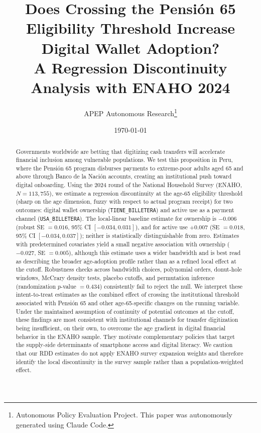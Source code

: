 \documentclass[12pt]{article}
\title{Does Crossing the Pensi\'on 65 Eligibility Threshold Increase Digital Wallet Adoption?\\ A Regression Discontinuity Analysis with ENAHO 2024}
\author{APEP Autonomous Research\thanks{%
Autonomous Policy Evaluation Project. This paper was autonomously generated using Claude Code.}}
\date{\today}
\begin{document}
\maketitle

\begin{abstract}
\noindent
Governments worldwide are betting that digitizing cash transfers will accelerate financial inclusion among vulnerable populations. We test this proposition in Peru, where the Pensi\'on 65 program disburses payments to extreme-poor adults aged 65 and above through Banco de la Naci\'on accounts, creating an institutional push toward digital onboarding. Using the 2024 round of the National Household Survey (ENAHO, $N=113{,}755$), we estimate a regression discontinuity at the age-65 eligibility threshold (sharp on the age dimension, fuzzy with respect to actual program receipt) for two outcomes: digital wallet ownership (\texttt{TIENE\_BILLETERA}) and active use as a payment channel (\texttt{USA\_BILLETERA}). The local-linear baseline estimate for ownership is $-0.006$ (robust SE $=0.016$, 95\% CI $[-0.034, 0.031]$), and for active use $+0.007$ (SE $=0.018$, 95\% CI $[-0.034, 0.037]$); neither is statistically distinguishable from zero. Estimates with predetermined covariates yield a small negative association with ownership ($-0.027$, SE $=0.005$), although this estimate uses a wider bandwidth and is best read as describing the broader age-adoption profile rather than as a refined local effect at the cutoff. Robustness checks across bandwidth choices, polynomial orders, donut-hole windows, McCrary density tests, placebo cutoffs, and permutation inference (randomization $p$-value $=0.434$) consistently fail to reject the null. We interpret these intent-to-treat estimates as the combined effect of crossing the institutional threshold associated with Pensi\'on 65 and other age-65-specific changes on the running variable. Under the maintained assumption of continuity of potential outcomes at the cutoff, these findings are most consistent with institutional channels for transfer digitization being insufficient, on their own, to overcome the age gradient in digital financial behavior in the ENAHO sample. They motivate complementary policies that target the supply-side determinants of smartphone access and digital literacy. We caution that our RDD estimates do not apply ENAHO survey expansion weights and therefore identify the local discontinuity in the survey sample rather than a population-weighted effect.
\end{abstract}
\end{document}
